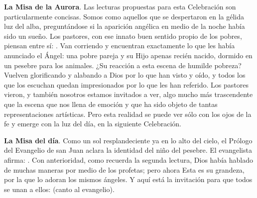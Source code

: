\begin{body}
\begin{body}
\textbf{La Misa de la Aurora}. Las lecturas propuestas para esta Celebración son particularmente concisas. Somos como aquellos que se despertaron en la gélida luz del alba, preguntándose si la aparición angélica en medio de la noche había sido un sueño. Los pastores, con ese innato buen sentido propio de los pobres, piensan entre sí: . Van corriendo y encuentran exactamente lo que les había anunciado el Ángel: una pobre pareja y su Hijo apenas recién nacido, dormido en un pesebre para los animales. ¿Su reacción a esta escena de humilde pobreza? Vuelven glorificando y alabando a Dios por lo que han visto y oído, y todos los que los escuchan quedan impresionados por lo que les han referido. Los pastores vieron, y también nosotros estamos invitados a ver, algo mucho más trascendente que la escena que nos llena de emoción y que ha sido objeto de tantas representaciones artísticas. Pero esta realidad se puede ver sólo con los ojos de la fe y emerge con la luz del día, en la siguiente Celebración.

\textbf{La Misa del día}. Como un sol resplandeciente ya en lo alto del cielo, el Prólogo del Evangelio de san Juan aclara la identidad del niño del pesebre. El evangelista afirma: . Con anterioridad, como recuerda la segunda lectura, Dios había hablado de muchas maneras por medio de los profetas; pero ahora  Esta es su grandeza, por la que lo adoran los mismos ángeles. Y aquí está la invitación para que todos se unan a ellos:  (canto al evangelio).


\end{body}
\end{body}
